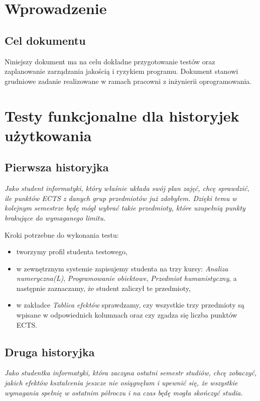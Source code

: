 \documentclass{article}
\begin{document}
\section{Wprowadzenie}

\subsection{Cel dokumentu}
Niniejszy dokument ma na celu dokładne przygotowanie testów oraz zaplanowanie zarządzania jakością i ryzykiem programu.
Dokument stanowi grudniowe zadanie realizowane w ramach pracowni z inżynierii oprogramowania.


\section{Testy funkcjonalne dla historyjek użytkowania}
\subsection{Pierwsza historyjka}
\textit{Jako student informatyki, który właśnie układa swój plan zajęć, chcę sprawdzić, ile punktów ECTS z danych grup przedmiotów już zdobyłem.
Dzięki temu w kolejnym semestrze będę mógł wybrać takie przedmioty, które uzupełnią punkty brakujące do wymaganego limitu.}

\medskip
\noindent Kroki potrzebne do wykonania testu:
\begin{itemize}
 \item tworzymy profil studenta testowego,
 \item w zewnętrznym systemie zapisujemy studenta na trzy kursy: \textit{Analiza numeryczna(L)}, \textit{Programowanie obiektowe}, \textit{Przedmiot humanistyczny}, a następnie zaznaczamy, że student zaliczył te przedmioty,
 \item w zakładce \textit{Tablica efektów} sprawdzamy, czy wszystkie trzy przedmioty są wpisane w odpowiednich kolumnach oraz czy zgadza się liczba punktów ECTS.
\end{itemize}


\subsection{Druga historyjka}
\textit{Jako studentka informatyki, która zaczyna ostatni semestr studiów, chcę zobaczyć, jakich efektów kształcenia jeszcze nie osiągnęłam i upewnić się, że wszystkie wymagania spełnię w ostatnim półroczu i na czas będę mogła skończyć studia.}
\end{document}
